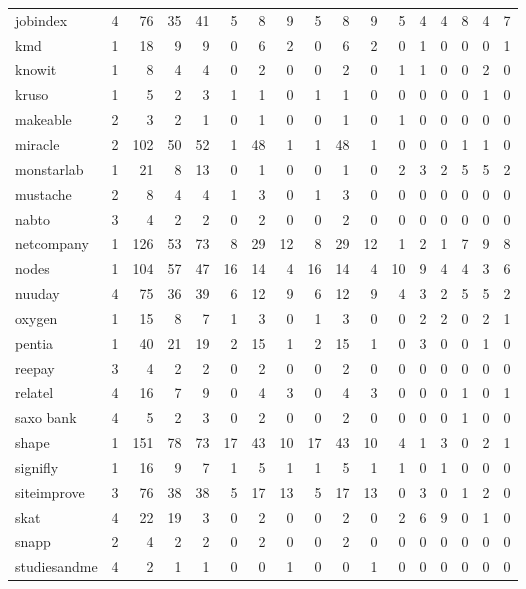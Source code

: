\begin{table}
\begin{tabular}{lrrrrrrrrrrrrrrrr}
jobindex & 4 & 76 & 35 & 41 & 5 & 8 & 9 & 5 & 8 & 9 & 5 & 4 & 4 & 8 & 4 & 7 \\
kmd & 1 & 18 & 9 & 9 & 0 & 6 & 2 & 0 & 6 & 2 & 0 & 1 & 0 & 0 & 0 & 1 \\
knowit & 1 & 8 & 4 & 4 & 0 & 2 & 0 & 0 & 2 & 0 & 1 & 1 & 0 & 0 & 2 & 0 \\
kruso & 1 & 5 & 2 & 3 & 1 & 1 & 0 & 1 & 1 & 0 & 0 & 0 & 0 & 0 & 1 & 0 \\
makeable & 2 & 3 & 2 & 1 & 0 & 1 & 0 & 0 & 1 & 0 & 1 & 0 & 0 & 0 & 0 & 0 \\
miracle & 2 & 102 & 50 & 52 & 1 & 48 & 1 & 1 & 48 & 1 & 0 & 0 & 0 & 1 & 1 & 0 \\
monstarlab & 1 & 21 & 8 & 13 & 0 & 1 & 0 & 0 & 1 & 0 & 2 & 3 & 2 & 5 & 5 & 2 \\
mustache & 2 & 8 & 4 & 4 & 1 & 3 & 0 & 1 & 3 & 0 & 0 & 0 & 0 & 0 & 0 & 0 \\
nabto & 3 & 4 & 2 & 2 & 0 & 2 & 0 & 0 & 2 & 0 & 0 & 0 & 0 & 0 & 0 & 0 \\
netcompany & 1 & 126 & 53 & 73 & 8 & 29 & 12 & 8 & 29 & 12 & 1 & 2 & 1 & 7 & 9 & 8 \\
nodes & 1 & 104 & 57 & 47 & 16 & 14 & 4 & 16 & 14 & 4 & 10 & 9 & 4 & 4 & 3 & 6 \\
nuuday & 4 & 75 & 36 & 39 & 6 & 12 & 9 & 6 & 12 & 9 & 4 & 3 & 2 & 5 & 5 & 2 \\
oxygen & 1 & 15 & 8 & 7 & 1 & 3 & 0 & 1 & 3 & 0 & 0 & 2 & 2 & 0 & 2 & 1 \\
pentia & 1 & 40 & 21 & 19 & 2 & 15 & 1 & 2 & 15 & 1 & 0 & 3 & 0 & 0 & 1 & 0 \\
reepay & 3 & 4 & 2 & 2 & 0 & 2 & 0 & 0 & 2 & 0 & 0 & 0 & 0 & 0 & 0 & 0 \\
relatel & 4 & 16 & 7 & 9 & 0 & 4 & 3 & 0 & 4 & 3 & 0 & 0 & 0 & 1 & 0 & 1 \\
saxo bank & 4 & 5 & 2 & 3 & 0 & 2 & 0 & 0 & 2 & 0 & 0 & 0 & 0 & 1 & 0 & 0 \\
shape & 1 & 151 & 78 & 73 & 17 & 43 & 10 & 17 & 43 & 10 & 4 & 1 & 3 & 0 & 2 & 1 \\
signifly & 1 & 16 & 9 & 7 & 1 & 5 & 1 & 1 & 5 & 1 & 1 & 0 & 1 & 0 & 0 & 0 \\
siteimprove & 3 & 76 & 38 & 38 & 5 & 17 & 13 & 5 & 17 & 13 & 0 & 3 & 0 & 1 & 2 & 0 \\
skat & 4 & 22 & 19 & 3 & 0 & 2 & 0 & 0 & 2 & 0 & 2 & 6 & 9 & 0 & 1 & 0 \\
snapp & 2 & 4 & 2 & 2 & 0 & 2 & 0 & 0 & 2 & 0 & 0 & 0 & 0 & 0 & 0 & 0 \\
studiesandme & 4 & 2 & 1 & 1 & 0 & 0 & 1 & 0 & 0 & 1 & 0 & 0 & 0 & 0 & 0 & 0 \\

\end{tabular}
\end{table}

